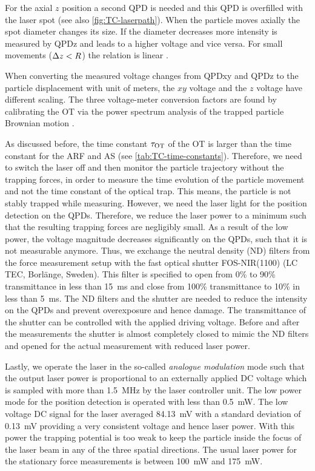 For the axial $z$ position a second QPD is needed and this QPD is overfilled 
with the laser spot (see also \cref{fig:TC-laserpath}). When the particle moves 
axially the spot diameter changes its size. If the diameter decreases more 
intensity is measured by QPDz and leads to a higher voltage and vice versa. For 
small movements ($\Delta z < R$) the relation is linear \cite{Dreyer2004}.

When converting the measured voltage changes from QPDxy and QPDz to the 
particle displacement with unit of meters, the $xy$ voltage and the $z$ voltage 
have different scaling. The three voltage-meter conversion factors are found by 
calibrating the OT via the power spectrum analysis of the trapped particle 
Brownian motion \cite{Lamprecht2021,Lamprecht2016,Lakaemper2015}.

As discussed before, the time constant $\tau_{\mathrm{OT}}$ of the OT is larger than the 
time constant for the ARF and AS (see \cref{tab:TC-time-constants}). Therefore, we 
need to switch the laser off and then monitor the particle trajectory without 
the trapping forces, in order to measure the time evolution of the particle 
movement and not the time constant of the optical trap. This means, the particle 
is not stably trapped while measuring. However, we need the laser light for 
the position detection on the QPDs. Therefore, we reduce the laser power to a 
minimum such that the resulting trapping forces are negligibly small. As a 
result of the low power, the voltage magnitude decreases significantly on the 
QPDs, such that it is not measurable anymore. Thus, we exchange the neutral 
density (ND) filters from the force measurement setup 
\cite{Lamprecht2016,Lamprecht2021} with the fast optical shutter FOS-NIR(1100) 
(LC TEC, Borlänge, Sweden). This filter is specified to open from 0\% to 90\% 
transmittance in less than \SI{15}{\ms} and close from 100\% transmittance to 
10\% in less than \SI{5}{\ms}. The ND filters and the shutter are needed to 
reduce the intensity on the QPDs and prevent overexposure and hence damage. 
The transmittance of the shutter can be controlled with the applied driving 
voltage. Before and after the measurements the shutter is almost completely 
closed to mimic the ND filters and opened for the actual measurement with 
reduced laser power.

Lastly, we operate the laser in the so-called \emph{analogue modulation} mode 
such that the output laser power is proportional to an externally applied DC 
voltage which is sampled with more than \SI{1.5}{\MHz} by the laser controller 
unit. The low power mode for the position detection is operated with less than 
\SI{0.5}{\mW}. The low voltage DC signal for the laser averaged \SI{84.13}{\mV} 
with a standard deviation of \SI{0.13}{\mV} providing a very consistent voltage 
and hence laser power. With this power the trapping potential is too weak to 
keep the particle inside the focus of the laser beam in any of the three 
spatial directions. The usual laser power for the stationary force measurements 
is between \SI{100}{\mW} and \SI{175}{\mW}.


